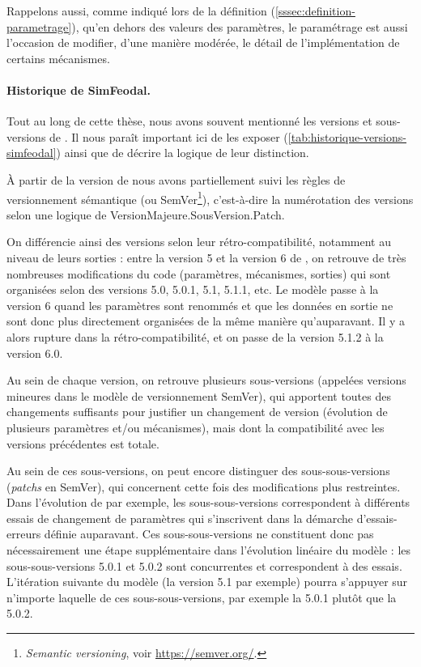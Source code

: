 Rappelons aussi, comme indiqué lors de la définition (\cref{sssec:definition-parametrage}), qu'en dehors des valeurs des paramètres, le paramétrage est aussi l'occasion de modifier, d'une manière modérée, le détail de l'implémentation de certains mécanismes.

\clearpage
\paragraph{Historique de SimFeodal.}\label{par:historique-versions-simfeodal}

Tout au long de cette thèse, nous avons souvent mentionné les versions et sous-versions de \simfeodal{}.
Il nous paraît important ici de les exposer (\cref{tab:historique-versions-simfeodal}) ainsi que de décrire la logique de leur distinction.


\clearpage

À partir de la version \fg{} de \simfeodal{} nous avons partiellement suivi les règles de \og versionnement sémantique\fg{} (ou \og SemVer\fg{}\footnote{
	\og \textit{Semantic versioning}\fg{}, voir \href{https://semver.org/}{https://semver.org/}.
}), c'est-à-dire la numérotation des versions selon une logique de \og VersionMajeure.SousVersion.Patch\fg{}.

On différencie ainsi des versions selon leur rétro-compatibilité, notamment au niveau de leurs sorties : entre la version 5 et la version 6 de \simfeodal{}, on retrouve de très nombreuses modifications du code (paramètres, mécanismes, sorties) qui sont organisées selon des versions 5.0, 5.0.1, 5.1, 5.1.1, etc.
Le modèle passe à la version 6 quand les paramètres sont renommés et que les données en sortie ne sont donc plus directement organisées de la même manière qu'auparavant.
Il y a alors rupture dans la rétro-compatibilité, et on passe de la version 5.1.2 à la version 6.0.

Au sein de chaque version, on retrouve plusieurs sous-versions (appelées \og versions mineures\fg{} dans le modèle de versionnement SemVer), qui apportent toutes des changements suffisants pour justifier un changement de version (évolution de plusieurs paramètres et/ou mécanismes), mais dont la compatibilité avec les versions précédentes est totale.

Au sein de ces sous-versions, on peut encore distinguer des \og sous-sous-versions\fg{} (\og \textit{patchs}\fg{} en SemVer), qui concernent cette fois des modifications plus restreintes.
Dans l'évolution de \simfeodal{} par exemple, les sous-sous-versions correspondent à différents essais de changement de paramètres qui s'inscrivent dans la démarche d'essais-erreurs définie auparavant.
Ces sous-sous-versions ne constituent donc pas nécessairement une étape supplémentaire dans l'évolution \og linéaire\fg{} du modèle : les sous-sous-versions 5.0.1 et 5.0.2 sont concurrentes et correspondent à des essais.
L'itération suivante du modèle (la version 5.1 par exemple) pourra s'appuyer sur n'importe laquelle de ces sous-sous-versions, par exemple la 5.0.1 plutôt que la 5.0.2.

